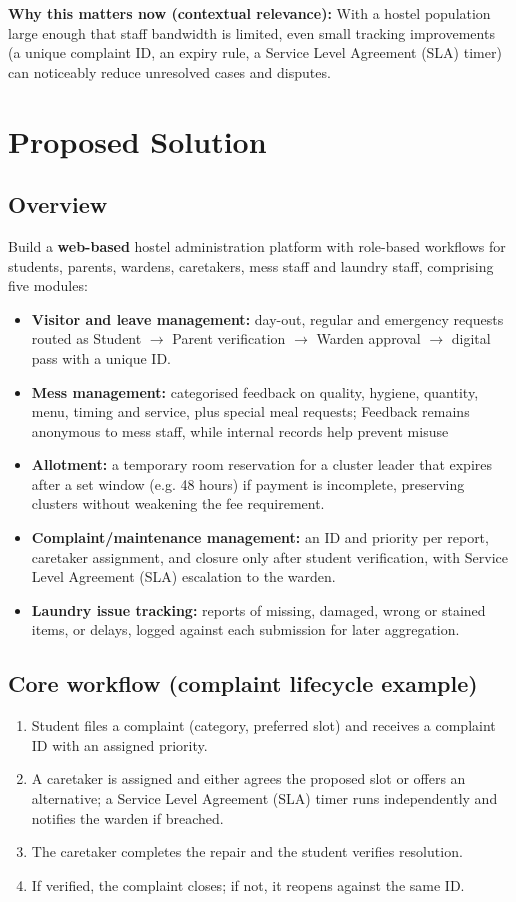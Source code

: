 \documentclass[11pt,a4paper]{article}
\begin{document}
\textbf{Why this matters now (contextual relevance):} With a hostel population large enough
that staff bandwidth is limited, even small tracking improvements (a unique complaint ID, an
expiry rule, a Service Level Agreement (SLA) timer) can noticeably reduce unresolved cases and disputes.

\section{Proposed Solution }
\subsection{Overview}
Build a \textbf{web-based} hostel administration platform with role-based workflows for
students, parents, wardens, caretakers, mess staff and laundry staff, comprising five modules:
\begin{itemize}[leftmargin=0.7cm]
    \item \textbf{Visitor and leave management:} day-out, regular and emergency requests
    routed as Student $\rightarrow$ Parent verification $\rightarrow$ Warden approval
    $\rightarrow$ digital pass with a unique ID.
    \item \textbf{Mess management:} categorised feedback on quality, hygiene, quantity, menu,
    timing and service, plus special meal requests; Feedback remains anonymous to mess staff, while internal records help prevent misuse
    \item \textbf{Allotment:} a temporary room reservation for a cluster leader that expires
    after a set window (e.g. 48 hours) if payment is incomplete, preserving clusters without
    weakening the fee requirement.
    \item \textbf{Complaint/maintenance management:} an ID and priority per report, caretaker
    assignment, and closure only after student verification, with Service Level Agreement (SLA) escalation to the
    warden.
    \item \textbf{Laundry issue tracking:} reports of missing, damaged, wrong or stained items,
    or delays, logged against each submission for later aggregation.
\end{itemize}

\subsection{Core workflow (complaint lifecycle example)}
\begin{enumerate}[leftmargin=0.7cm]
    \item Student files a complaint (category, preferred slot) and receives a complaint ID
    with an assigned priority.
    \item A caretaker is assigned and either agrees the proposed slot or offers an alternative;
    a Service Level Agreement (SLA) timer runs independently and notifies the warden if breached.
    \item The caretaker completes the repair and the student verifies resolution.
    \item If verified, the complaint closes; if not, it reopens against the same ID.
\end{enumerate}
\end{document}
